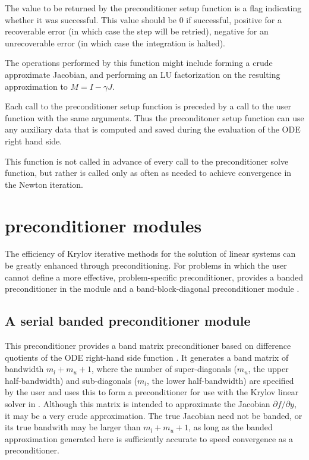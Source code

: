 {
  The value to be returned by the preconditioner setup function is a flag indicating 
  whether it was successful.  This value should be $0$ if successful, 
  positive for a recoverable error (in which case the step will be retried),     
  negative for an unrecoverable error (in which case the integration is halted). 
}
{
  The operations performed by this function might include forming a crude 
  approximate Jacobian, and performing an LU factorization on the resulting            
  approximation to $M=I - \gamma J$.

  Each call to the preconditioner setup function is preceded by a call to     
  the  user function with the same  arguments.  
  Thus the preconditoner setup function can use any auxiliary data that is 
  computed and saved during the evaluation of the ODE right hand side.
  
  This function is not called in advance of every call to the preconditioner solve
  function, but rather is called only as often as needed to achieve convergence in the
  Newton iteration. 
}

\section{{\cvode} preconditioner modules}\label{ss:preconds}

The efficiency of Krylov iterative methods for the solution of linear systems 
can be greatly enhanced through preconditioning. For problems in which the 
user cannot define a more effective, problem-specific preconditioner,
{\cvode} provides a banded preconditioner in the module {\cvbandpre} and
a band-block-diagonal preconditioner module {\cvbbdpre}.

\subsection{A serial banded preconditioner module}\label{sss:cvbandpre}

This preconditioner provides a band matrix preconditioner based on
difference quotients of the ODE right-hand side function .
It generates a band matrix of bandwidth $m_l + m_u + 1$, where
the number of super-diagonals ($m_u$, the upper half-bandwidth) and
sub-diagonals ($m_l$, the lower half-bandwidth) are specified by
the user and uses this to form a preconditioner for use with the Krylov
linear solver in {\cvspgmr}.  Although this matrix is intended
to approximate the Jacobian $\partial f / \partial y$, 
it may be a very crude approximation.  The true Jacobian need not be banded, or its
true bandwith may be larger than $m_l + m_u + 1$, as long as the
banded approximation generated here is sufficiently accurate
to speed convergence as a preconditioner. 

